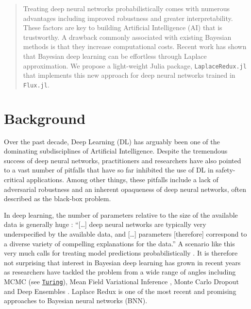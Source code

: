 \documentclass{juliacon}
\begin{document}


\maketitle

\begin{abstract}

Treating deep neural networks probabilistically comes with numerous advantages including improved robustness and greater interpretability. These factors are key to building Artificial Intelligence (AI) that is trustworthy. A drawback commonly associated with existing Bayesian methods is that they increase computational costs. Recent work has shown that Bayesian deep learning can be effortless through Laplace approximation. We propose a light-weight Julia package, \texttt{LaplaceRedux.jl} that implements this new approach for deep neural networks trained in \texttt{Flux.jl}.

\end{abstract}

\section{Background}\label{sec-intro}

Over the past decade, Deep Learning (DL) has arguably been one of the
dominating subdisciplines of Artificial Intelligence. Despite the
tremendous success of deep neural networks, practitioners and
researchers have also pointed to a vast number of pitfalls that have so
far inhibited the use of DL in safety-critical applications. Among other
things, these pitfalls include a lack of adversarial robustness
\cite{goodfellow2014explaining} and an inherent opaqueness of deep
neural networks, often described as the black-box problem.

In deep learning, the number of parameters relative to the size of the
available data is generally huge \cite{wilson2020case}: ``{[}\ldots{]}
deep neural networks are typically very underspecified by the available
data, and {[}\ldots{]} parameters {[}therefore{]} correspond to a
diverse variety of compelling explanations for the data.'' A scenario
like this very much calls for treating model predictions
probabilistically \cite{wilson2020case}. It is therefore not surprising
that interest in Bayesian deep learning has grown in recent years as
researchers have tackled the problem from a wide range of angles
including MCMC (see
\href{https://turing.ml/dev/tutorials/03-bayesian-neural-network/}{\texttt{Turing}}),
Mean Field Variational Inference \cite{blundell2015weight}, Monte Carlo
Dropout \cite{gal2016dropout} and Deep Ensembles
\cite{lakshminarayanan2016simple}. Laplace Redux
\cite{immer2020improving,daxberger2021laplace} is one of the most recent
and promising approaches to Bayesian neural networks (BNN).
\end{document}
